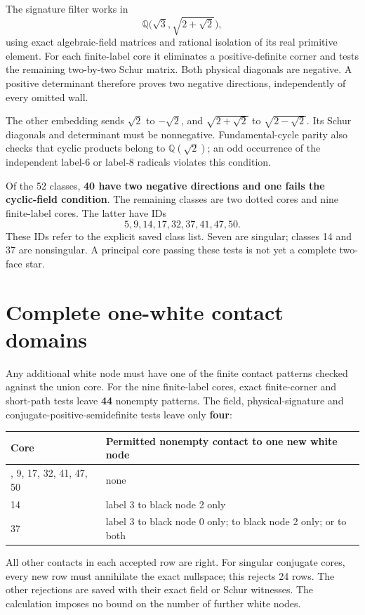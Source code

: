 \documentclass[
  10pt,
]{report}
\newcounter{none} %
\begin{document}
The signature filter works in \[
\mathbb Q\bigl(\sqrt3,\sqrt{2+\sqrt2}\bigr),
\] using exact algebraic-field matrices and rational isolation of its
real primitive element. For each finite-label core it eliminates a
positive-definite corner and tests the remaining two-by-two Schur
matrix. Both physical diagonals are negative. A positive determinant
therefore proves two negative directions, independently of every omitted
wall.

The other embedding sends \(\sqrt2\) to \(-\sqrt2\), and
\(\sqrt{2+\sqrt2}\) to \(\sqrt{2-\sqrt2}\). Its Schur diagonals and
determinant must be nonnegative. Fundamental-cycle parity also checks
that cyclic products belong to \(\mathbb Q(\sqrt2)\); an odd occurrence
of the independent label-6 or label-8 radicals violates this condition.

Of the 52 classes, \textbf{40 have two negative directions and one fails
the cyclic-field condition}. The remaining classes are two dotted cores
and nine finite-label cores. The latter have IDs \[
5,9,14,17,32,37,41,47,50.
\] These IDs refer to the explicit saved class list. Seven are singular;
classes 14 and 37 are nonsingular. A principal core passing these tests
is not yet a complete two-face star.

\section{Complete one-white contact
domains}\label{complete-one-white-contact-domains}

Any additional white node must have one of the finite contact patterns
checked against the union core. For the nine finite-label cores, exact
finite-corner and short-path tests leave \textbf{44} nonempty patterns.
The field, physical-signature and conjugate-positive-semidefinite tests
leave only \textbf{four}:

{\def\LTcaptype{none} %
\begin{longtable}[]{@{}ll@{}}
\toprule\noalign{}
Core & Permitted nonempty contact to one new white node \\
\midrule\noalign{}
\endhead
\bottomrule\noalign{}
\endlastfoot
5, 9, 17, 32, 41, 47, 50 & none \\
14 & label 3 to black node 2 only \\
37 & label 3 to black node 0 only; to black node 2 only; or to both \\
\end{longtable}
}

All other contacts in each accepted row are right. For singular
conjugate cores, every new row must annihilate the exact nullspace; this
rejects 24 rows. The other rejections are saved with their exact field
or Schur witnesses. The calculation imposes no bound on the number of
further white nodes.
\end{document}
